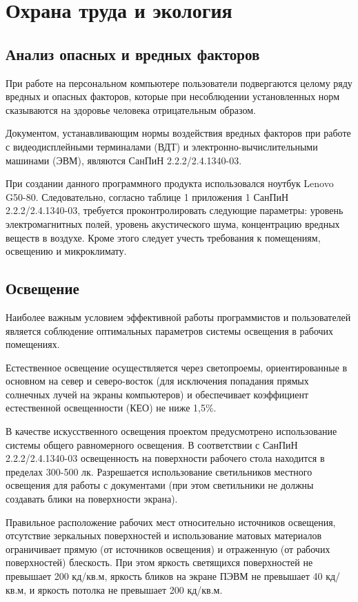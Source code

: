 \chapter{Охрана труда и экология}


\section{Анализ опасных и вредных факторов}
При работе на персональном компьютере пользователи подвергаются целому ряду вредных и опасных факторов, которые при несоблюдении установленных норм сказываются на здоровье человека отрицательным образом.

Документом, устанавливающим нормы воздействия вредных факторов при работе с видеодисплейными терминалами (ВДТ) и электронно-вычислительными машинами (ЭВМ), являются СанПиН 2.2.2/2.4.1340-03.

При создании данного программного  продукта использовался ноутбук Lenovo G50-80. Следовательно, согласно таблице 1 приложения 1 СанПиН 2.2.2/2.4.1340-03, требуется проконтролировать следующие параметры: уровень электромагнитных полей, уровень акустического шума, концентрацию вредных веществ в воздухе. Кроме этого следует учесть требования к помещениям, освещению и микроклимату.


\section{Освещение}
Наиболее важным условием эффективной работы программистов и пользователей является соблюдение оптимальных параметров системы освещения в рабочих помещениях.

Естественное освещение осуществляется через светопроемы, ориентированные в основном на север и северо-восток (для исключения попадания прямых солнечных лучей на экраны компьютеров) и обеспечивает коэффициент естественной освещенности (КЕО) не ниже 1,5\%.

В качестве искусственного освещения проектом предусмотрено использование системы общего равномерного освещения. В соответствии с СанПиН 2.2.2/2.4.1340-03 освещенность на поверхности рабочего стола находится в пределах 300-500 лк. Разрешается использование светильников местного освещения для работы с документами (при этом светильники не должны создавать блики на поверхности экрана).

Правильное расположение рабочих мест относительно источников освещения, отсутствие зеркальных поверхностей и использование матовых материалов ограничивает прямую (от источников освещения) и отраженную (от рабочих
поверхностей) блескость. При этом яркость светящихся поверхностей не превышает 200 кд/кв.м, яркость бликов на экране ПЭВМ не превышает 40 кд/кв.м, и яркость потолка не превышает 200 кд/кв.м.


